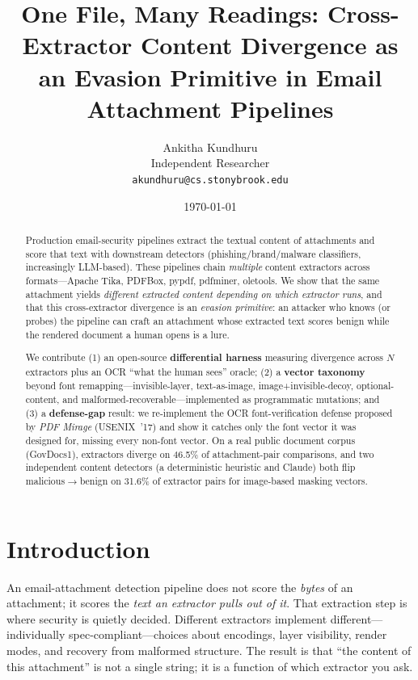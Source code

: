 \documentclass[11pt]{article}
\title{One File, Many Readings: Cross-Extractor Content Divergence as
an Evasion Primitive in Email Attachment Pipelines}
\author{Ankitha Kundhuru\\[2pt]
  \small Independent Researcher\\
  \small \texttt{akundhuru@cs.stonybrook.edu}}
\date{\today}
\begin{document}
\maketitle

\begin{abstract}
Production email-security pipelines extract the textual content of attachments
and score that text with downstream detectors (phishing/brand/malware
classifiers, increasingly LLM-based). These pipelines chain \emph{multiple}
content extractors across formats---Apache Tika, PDFBox, pypdf, pdfminer,
oletools. We show that the same attachment yields \emph{different extracted
content depending on which extractor runs}, and that this cross-extractor
divergence is an \emph{evasion primitive}: an attacker who knows (or probes) the
pipeline can craft an attachment whose extracted text scores benign while the
rendered document a human opens is a lure.

We contribute (1) an open-source \textbf{differential harness} measuring
divergence across $N$ extractors plus an OCR ``what the human sees'' oracle; (2)
a \textbf{vector taxonomy} beyond font remapping---invisible-layer,
text-as-image, image+invisible-decoy, optional-content, and
malformed-recoverable---implemented as programmatic mutations; and (3) a
\textbf{defense-gap} result: we re-implement the OCR font-verification defense
proposed by \emph{PDF Mirage} (USENIX~'17) and show it catches only the font
vector it was designed for, missing every non-font vector. On a real public
document corpus (GovDocs1), extractors diverge on 46.5\% of attachment-pair
comparisons, and two independent content detectors (a deterministic heuristic
and Claude) both flip malicious$\rightarrow$benign on 31.6\% of extractor pairs
for image-based masking vectors.
\end{abstract}

\section{Introduction}

An email-attachment detection pipeline does not score the \emph{bytes} of an
attachment; it scores the \emph{text an extractor pulls out of it}. That
extraction step is where security is quietly decided. Different extractors
implement different---individually spec-compliant---choices about encodings,
layer visibility, render modes, and recovery from malformed structure. The
result is that ``the content of this attachment'' is not a single string; it is
a function of which extractor you ask.
\end{document}
